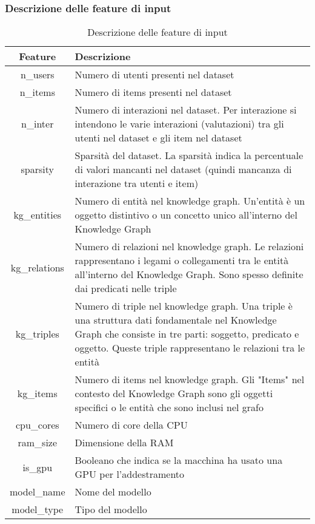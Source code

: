 \subsubsection{Descrizione delle feature di input}
\begin{center}
\begin{table}[H]
    \centering
    \begin{tabularx}{\textwidth}{|c|X|}
        \hline
        \textbf{Feature} & \textbf{Descrizione} \\
        \hline
        n\_users & Numero di utenti presenti nel dataset \\
        \hline
        n\_items & Numero di items presenti nel dataset \\
        \hline
        n\_inter & Numero di interazioni nel dataset. Per interazione si intendono le varie interazioni (valutazioni) tra gli utenti nel dataset e gli item nel dataset \\
        \hline
        sparsity & Sparsità del dataset. La sparsità indica la percentuale di valori mancanti nel dataset (quindi mancanza di interazione tra utenti e item)\\
        \hline
        kg\_entities & Numero di entità nel knowledge graph. Un'entità è un oggetto distintivo o un concetto unico all'interno del Knowledge Graph \\
        \hline
        kg\_relations & Numero di relazioni nel knowledge graph. Le relazioni rappresentano i legami o collegamenti tra le entità all'interno del Knowledge Graph. Sono spesso definite dai predicati nelle triple \\
        \hline
        kg\_triples & Numero di triple nel knowledge graph. Una triple è una struttura dati fondamentale nel Knowledge Graph che consiste in tre parti: soggetto, predicato e oggetto. Queste triple rappresentano le relazioni tra le entità \\
        \hline
        kg\_items & Numero di items nel knowledge graph. Gli "Items" nel contesto del Knowledge Graph sono gli oggetti specifici o le entità che sono inclusi nel grafo \\
        \hline
        cpu\_cores & Numero di core della CPU \\
        \hline
        ram\_size & Dimensione della RAM \\
        \hline
        is\_gpu & Booleano che indica se la macchina ha usato una GPU per l'addestramento \\
        \hline
        model\_name & Nome del modello \\
        \hline
        model\_type & Tipo del modello \\
        \hline
    \end{tabularx}
    \caption{Descrizione delle feature di input}
\end{table}
\end{center}

